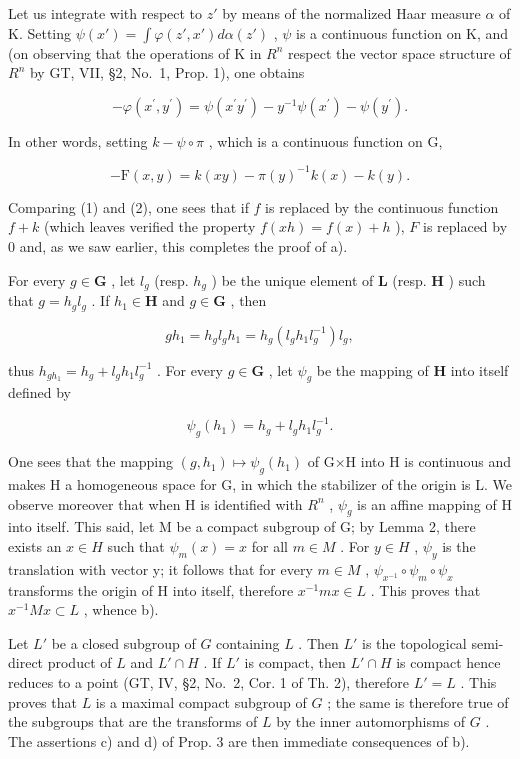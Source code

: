 Let us integrate with respect to \(z'\) by means of the normalized Haar measure \(\alpha\) of K. Setting \(\psi(x') = \int \varphi(z', x') d\alpha(z')\) , \(\psi\) is a continuous function on K, and (on observing that the operations of K in \(R^{n}\) respect the vector space structure of \(R^{n}\) by GT, VII, §2, No.~1, Prop. 1), one obtains

\[
- \varphi (x ^ {\prime}, y ^ {\prime}) = \psi (x ^ {\prime} y ^ {\prime}) - y ^ {- 1} \psi (x ^ {\prime}) - \psi (y ^ {\prime}).
\]

In other words, setting \(k - \psi \circ \pi\) , which is a continuous function on G,

\[
- \mathrm{F} (x, y) = k (x y) - \pi (y) ^ {- 1} k (x) - k (y).\tag{2}
\]

Comparing (1) and (2), one sees that if \(f\) is replaced by the continuous function \(f + k\) (which leaves verified the property \(f(xh) = f(x) + h\) ), \(F\) is replaced by 0 and, as we saw earlier, this completes the proof of a).

For every \(g \in \mathbf{G}\) , let \(l_g\) (resp. \(h_g\) ) be the unique element of \(\mathbf{L}\) (resp. \(\mathbf{H}\) ) such that \(g = h_g l_g\) . If \(h_1 \in \mathbf{H}\) and \(g \in \mathbf{G}\) , then

\[
g h _ {1} = h _ {g} l _ {g} h _ {1} = h _ {g} (l _ {g} h _ {1} l _ {g} ^ {- 1}) l _ {g},
\]

thus \(h_{gh_1} = h_g + l_g h_1 l_g^{-1}\) . For every \(g \in \mathbf{G}\) , let \(\psi_g\) be the mapping of \(\mathbf{H}\) into itself defined by

\[
\psi_ {g} (h _ {1}) = h _ {g} + l _ {g} h _ {1} l _ {g} ^ {- 1}.
\]

One sees that the mapping \((g,h_{1})\mapsto\psi_{g}(h_{1})\) of G×H into H is continuous and makes H a homogeneous space for G, in which the stabilizer of the origin is L. We observe moreover that when H is identified with \(R^{n}\) , \(\psi_{g}\) is an affine mapping of H into itself. This said, let M be a compact subgroup of G; by Lemma 2, there exists an \(x\in H\) such that \(\psi_{m}(x)=x\) for all \(m\in M\) . For \(y\in H\) , \(\psi_{y}\) is the translation with vector y; it follows that for every \(m\in M\) , \(\psi_{x^{-1}}\circ\psi_{m}\circ\psi_{x}\) transforms the origin of H into itself, therefore \(x^{-1}mx\in L\) . This proves that \(x^{-1}Mx\subset L\) , whence b).

Let \(L'\) be a closed subgroup of \(G\) containing \(L\) . Then \(L'\) is the topological semi-direct product of \(L\) and \(L' \cap H\) . If \(L'\) is compact, then \(L' \cap H\) is compact hence reduces to a point (GT, IV, §2, No.~2, Cor. 1 of Th. 2), therefore \(L' = L\) . This proves that \(L\) is a maximal compact subgroup of \(G\) ; the same is therefore true of the subgroups that are the transforms of \(L\) by the inner automorphisms of \(G\) . The assertions c) and d) of Prop. 3 are then immediate consequences of b).

